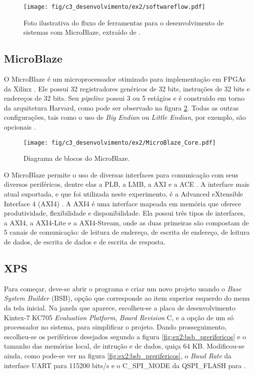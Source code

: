 \documentclass[11pt,a4paper,oneside]{book}
\begin{document}
\begin{figure}[htp]
\centering
\texttt{[image: fig/c3\_desenvolvimento/ex2/softwareflow.pdf]}
\caption{Foto ilustrativa do fluxo de ferramentas para o desenvolvimento de sistemas com MicroBlaze, extraído de \cite{ug081}.}
\label{fig:ex2:softwareflow}
\end{figure}

\subsection{MicroBlaze}
O MicroBlaze é um microprocessador otimizado para implementação em FPGAs da Xilinx \cite{ug081}.
Ele possui 32 registradores genéricos de 32 bits, instruções de 32 bits e endereços de 32 bits.
Seu \textit{pipeline} possui 3 ou 5 estágios e é construido em torno da arquitetura Harvard, como pode ser observado na figura \ref{fig:ex3:microblazecore}.
Todas as outras configurações, tais como o uso de \textit{Big Endian} ou \textit{Little Endian}, por exemplo, são opcionais \cite{ug081}.

\begin{figure}[h]
\centering
\texttt{[image: fig/c3\_desenvolvimento/ex2/MicroBlaze\_Core.pdf]}
\caption{Diagrama de blocos do MicroBlaze.}
\label{fig:ex3:microblazecore}
\end{figure}

O MicroBlaze permite o uso de diversas interfaces para comunicação com seus diversos periféricos, dentre elas a PLB, a LMB, a AXI e a ACE \cite{ug081}.
A interface mais atual suportada, e que foi utilizada neste experimento, é a Advanced eXtensible Interface 4 (AXI4) \cite{ug081, ug761}.
A AXI4 é uma interface mapeada em memória que oferece produtividade, flexibilidade e disponibilidade.
Ela possui três tipos de interfaces, a AXI4, a AXI4-Lite e a AXI4-Stream, onde as duas primeiras são compostam de 5 canais de comunicação: de leitura de endereço, de escrita de endereço, de leitura de dados, de escrita de dados e de escrita de resposta.

\subsection{XPS}
Para começar, deve-se abrir o programa e criar um novo projeto usando o \textit{Base System Builder} (BSB), opção que corresponde ao item superior esquerdo do menu da tela inicial.
Na janela que aparece, escolheu-se a placa de desenvolvimento Kintex-7 KC705 \textit{Evaluation Platform}, \textit{Board Revision} C, e a opção de um só processador no sistema, para simplificar o projeto.
Dando prosseguimento, escolheu-se os periféricos desejados segundo a figura \ref{fig:ex2:bsb_prerifericos} e o tamanho das memórias local, de intrução e de dados, quiça 64 KB.
Modificou-se ainda, como pode-se ver na figura \ref{fig:ex2:bsb_prerifericos}, o \textit{Baud Rate} da interface UART para 115200 bits/s e o C\_SPI\_MODE da QSPI\_FLASH para .
\end{document}
